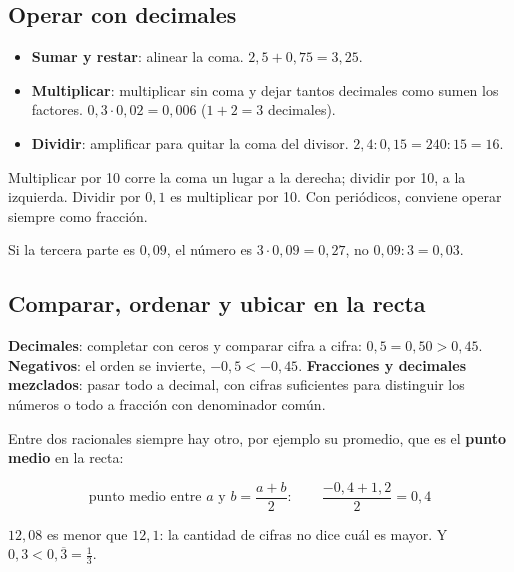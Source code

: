 \subsection{Operar con decimales}
\begin{itemize}
  \item \textbf{Sumar y restar}: alinear la coma. $2{,}5 + 0{,}75 = 3{,}25$.
  \item \textbf{Multiplicar}: multiplicar sin coma y dejar tantos decimales como sumen los factores. $0{,}3\cdot 0{,}02 = 0{,}006$ ($1 + 2 = 3$ decimales).
  \item \textbf{Dividir}: amplificar para quitar la coma del divisor. $2{,}4 : 0{,}15 = 240 : 15 = 16$.
\end{itemize}
Multiplicar por 10 corre la coma un lugar a la derecha; dividir por 10, a la izquierda. Dividir por $0{,}1$ es multiplicar por 10. Con periódicos, conviene operar siempre como fracción.
\begin{ojo} Si la tercera parte es $0{,}09$, el número es $3\cdot 0{,}09 = 0{,}27$, no $0{,}09 : 3 = 0{,}03$.\end{ojo}

\subsection{Comparar, ordenar y ubicar en la recta}
\textbf{Decimales}: completar con ceros y comparar cifra a cifra: $0{,}5 = 0{,}50 > 0{,}45$. \textbf{Negativos}: el orden se invierte, $-0{,}5 < -0{,}45$. \textbf{Fracciones y decimales mezclados}: pasar todo a decimal, con cifras suficientes para distinguir los números o todo a fracción con denominador común.

Entre dos racionales siempre hay otro, por ejemplo su promedio, que es el \textbf{punto medio} en la recta:
\begin{center}
\end{center}
\[ \text{punto medio entre } a \text{ y } b = \frac{a + b}{2}: \qquad \frac{-0{,}4 + 1{,}2}{2} = 0{,}4 \]
\begin{ojo}[Trampa] $12{,}08$ es menor que $12{,}1$: la cantidad de cifras no dice cuál es mayor. Y $0{,}3 < 0{,}\overline{3} = \tfrac{1}{3}$.\end{ojo}

